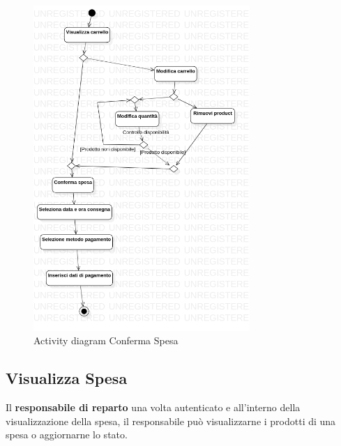 \documentclass[12pt, a4paper]{report}
\begin{document}
\begin{figure}[h]
  \centering
  \includegraphics[width=0.73\textwidth]{Use Case Model!Conferma spesa!ActivityConfermSpesa!ActivityDiagramConfermaSpesa_14.png}
  \caption{Activity diagram Conferma Spesa}
\end{figure}

\newpage

\subsection{Visualizza Spesa}

Il \textbf{responsabile di reparto} una volta autenticato e all'interno della
visualizzazione della spesa, il responsabile può visualizzarne i prodotti di
una spesa o aggiornarne lo stato.
\end{document}
